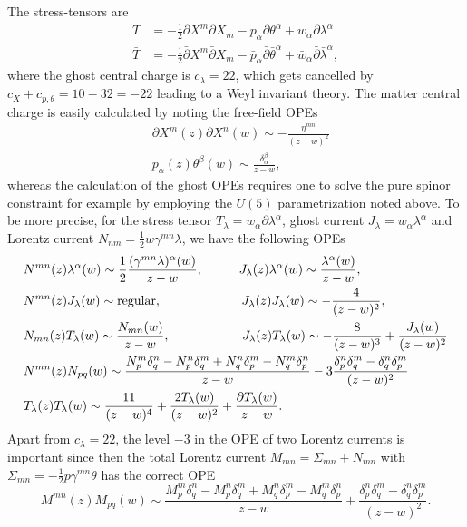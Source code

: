 \documentclass[12pt]{article}
\def\be{\begin{equation}}
\def\ee{\end{equation}}
\numberwithin{equation}{section}
\begin{document}
The stress-tensors are
\begin{align}
	T &= -\frac{1}{2}\partial X^m \partial X_m - p_\alpha \partial \theta^\alpha + w_\alpha \partial \lambda^\alpha \\
	\bar{T} &= -\frac{1}{2}\bar{\partial} X^m \bar{\partial} X_m - \bar{p}_\alpha \bar{\partial} \bar{\theta}^\alpha + \bar{w}_\alpha \bar{\partial} \bar{\lambda}^\alpha,
\end{align}
where the ghost central charge is $c_\lambda = 22$, which gets cancelled by $c_X + c_{p, \theta} = 10 - 32 = -22$ leading to a Weyl invariant theory. The matter central charge is easily calculated by noting the free-field OPEs
\begin{align}
&\partial X^m(z) \partial X^n(w) \sim - \frac{\eta^{mn}}{(z-w)^2} \\
&p_\alpha(z) \theta^\beta(w) \sim \frac{\delta^{\beta}_\alpha }{z-w},
\end{align}
whereas the calculation of the ghost OPEs requires one to solve the pure spinor constraint for example by employing the $U(5)$ parametrization noted above. To be more precise, for the stress tensor $T_\lambda = w_\alpha \partial \lambda^\alpha$, ghost current $J_\lambda = w_\alpha \lambda^\alpha$ and Lorentz current $N_{nm} = \frac{1}{2} w\gamma^{ m n}\lambda$, we have the following OPEs
\be
\begin{aligned}
	\label{OPEs}
	& N^{mn}(z) \lambda^\alpha(w) \sim \frac{1}{2} \frac{(\gamma^{mn}\lambda)^\alpha(w)}{z-w}, \hspace{1cm} J_\lambda(z) \lambda^\alpha(w) \sim \frac{\lambda^\alpha(w)}{z-w}, \\
	& N^{mn}(z) J_\lambda (w) \sim \text{regular}, \hspace{2.22cm}J_\lambda(z) J_\lambda(w) \sim -\frac{4}{(z-w)^2}, \\
	& N_{mn}(z) T_\lambda(w) \sim \frac{N_{mn}(w)}{z-w}, \hspace{2cm}J_\lambda(z) T_\lambda(w) \sim -\frac{8}{(z-w)^3} + \frac{J_\lambda(w)}{(z-w)^2} \\
	& N^{mn}(z)N_{pq}(w) \sim \frac{N^m_p\delta^n_q - N^n_p \delta^m_q + N^n_q\delta^m_p-N^m_q \delta^n_p}{z-w} - 3\frac{\delta^n_p\delta^m_q - \delta^n_q \delta^m_p}{(z-w)^2} \\
	& T_\lambda(z)T_\lambda(w) \sim \frac{11}{(z-w)^4} + \frac{2T_\lambda(w)}{(z-w)^2} + \frac{\partial T_\lambda(w)}{z-w}.
\end{aligned}
\ee
Apart from $c_\lambda = 22$, the level $-3$ in the OPE of two Lorentz currents is important since then the total Lorentz current $M_{mn} = \Sigma_{mn} + N_{mn}$ with $\Sigma_{mn} = -\frac{1}{2} p \gamma^{mn}\theta$ has the correct OPE
\be
 M^{mn}(z) M_{pq}(w) \sim \frac{M^m_p\delta^n_q - M^n_p \delta^m_q + M^n_q\delta^m_p-M^m_q \delta^n_p}{z-w} + \frac{\delta^n_p\delta^m_q - \delta^n_q \delta^m_p}{(z-w)^2}.
\ee
\end{document}
